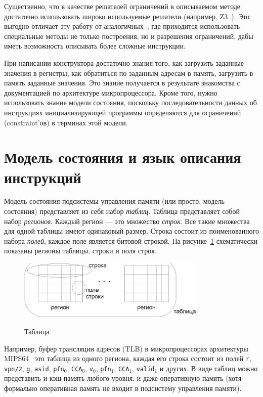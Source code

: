 \documentclass[14pt]{extreport}
\begin{document}
Существенно, что в качестве решателей ограничений в описываемом методе достаточно использовать широко используемые решатели (например, Z3~\cite{Z3}). Это выгодно отличает эту работу от аналогичных~\cite{GenesysPro}, где приходится использовать специальные методы не только построения, но и разрешения ограничений, дабы иметь возможность описывать более сложные инструкции.

При написании конструктора достаточно знания того, как загрузить заданные значения в регистры, как обратиться по заданным адресам в память, загрузить в память заданные значения. Это знание получается в результате знакомства с документацией по архитектуре микропроцессора. Кроме того, нужно использовать знание модели состояния, поскольку последовательности данных об инструкциях инициализирующей программы определяются для ограничений (constraint'ов) в терминах этой модели.

\section{Модель состояния и язык описания инструкций}\label{state_model_section}

Модель состояния подсистемы управления памяти (или просто, модель состояния) представляет из себя набор \emph{таблиц}. Таблица представляет собой набор \emph{регионов}. Каждый регион --- это множество \emph{строк}. Все такие множества для одной таблицы имеют одинаковый размер. Строка состоит из поименованного набора \emph{полей}, каждое поле является битовой строкой. На рисунке~\ref{table_picture} схематически показаны регионы таблицы, строки и поля строк.

\begin{figure}[h] \center
  \includegraphics[width=0.8\textwidth]{2.theor/table.eps}\\
  \caption{Таблица}\label{table_picture}
\end{figure}

Например, буфер трансляции адресов (TLB) в микропроцессорах архитектуры MIPS64~\cite{mips64_III} это таблица из одного региона, каждая его строка состоит из полей \texttt{r}, \texttt{vpn/2}, \texttt{g}, \texttt{asid}, \texttt{pfn}$_0$, \texttt{CCA}$_0$, \texttt{v}$_0$, \texttt{pfn}$_1$, \texttt{CCA}$_1$, \texttt{valid}$_1$ и других. В виде таблиц можно представить и кэш-память любого уровня, и даже оперативную память (хотя формально оперативная память не входит в подсистему управления памяти).
\end{document}

